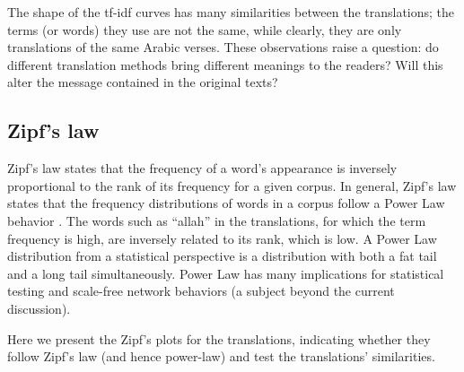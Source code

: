 \documentclass[
]{article}
\begin{document}
The shape of the tf-idf curves has many similarities between the translations; the terms (or words) they use are not the same, while clearly, they are only translations of the same Arabic verses. These observations raise a question: do different translation methods bring different meanings to the readers? Will this alter the message contained in the original texts?

\hypertarget{zipfs-law}{%
\subsection{Zipf's law}\label{zipfs-law}}

Zipf's law states that the frequency of a word's appearance is inversely proportional to the rank of its frequency for a given corpus. In general, Zipf's law states that the frequency distributions of words in a corpus follow a Power Law behavior \citep{zipf1949}. The words such as ``allah'' in the translations, for which the term frequency is high, are inversely related to its rank, which is low. A Power Law distribution from a statistical perspective is a distribution with both a fat tail and a long tail simultaneously. Power Law has many implications for statistical testing and scale-free network behaviors (a subject beyond the current discussion).

Here we present the Zipf's plots for the translations, indicating whether they follow Zipf's law (and hence power-law) and test the translations' similarities.
\end{document}
